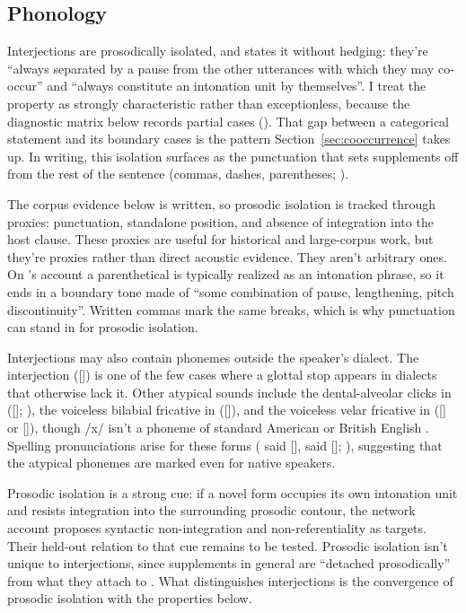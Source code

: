 \documentclass[12pt]{article}
\begin{document}
\subsection{Phonology}\label{sec:phonology}

Interjections are prosodically isolated, and \textcite[108]{ameka1992}
states it without hedging: they're \enquote{always separated by a pause from
the other utterances with which they may co-occur} and \enquote{always
constitute an intonation unit by themselves}. I treat the property as
strongly characteristic rather than exceptionless, because the diagnostic
matrix below records partial cases (). That gap between a
categorical statement and its boundary cases is the pattern
Section~\ref{sec:cooccurrence} takes up. In writing, this isolation surfaces
as the punctuation that sets supplements off from the rest of the sentence
(commas, dashes, parentheses; \citealp[1350]{HuddlestonPullum2002}).

The corpus evidence below is written, so prosodic isolation is tracked
through proxies: punctuation, standalone position, and absence of
integration into the host clause. These proxies are useful for historical
and large-corpus work, but they're proxies rather than direct acoustic
evidence. They aren't arbitrary ones.
On \textcite[41]{Jackendoff2025Parenthetical}'s account a parenthetical is
typically realized as an intonation phrase, so it ends in a boundary tone made
of \enquote{some combination of pause, lengthening, pitch discontinuity}.
Written commas mark the same breaks, which is why punctuation can stand in
for prosodic isolation.

Interjections may also contain phonemes outside the
speaker's dialect. The interjection  ([]) is one of
the few cases where a glottal stop appears in dialects that otherwise lack
it. Other atypical sounds include the dental-alveolar clicks in
 ([]; \citealp[147]{wilkins1992}), the voiceless bilabial fricative in
 ([]), and the voiceless velar fricative in
 ([] or []), though /x/ isn't a phoneme of
standard American or British English \citep[74, 853]{quirk1985}. Spelling
pronunciations arise for these forms ( said
[],  said []; \citealp[853]{quirk1985}),
suggesting that the atypical phonemes are marked even for native speakers.

Prosodic isolation is a strong cue: if
a novel form occupies its own intonation unit and resists integration into
the surrounding prosodic contour, the network account proposes syntactic
non-integration and non-referentiality as targets. Their held-out relation to
that cue remains to be tested. Prosodic isolation isn't unique to
interjections, since supplements in general are \enquote{detached
prosodically} from what they attach to \citep[66]{HuddlestonPullum2002}. What
distinguishes interjections is the convergence of prosodic isolation with
the properties below.
\end{document}
